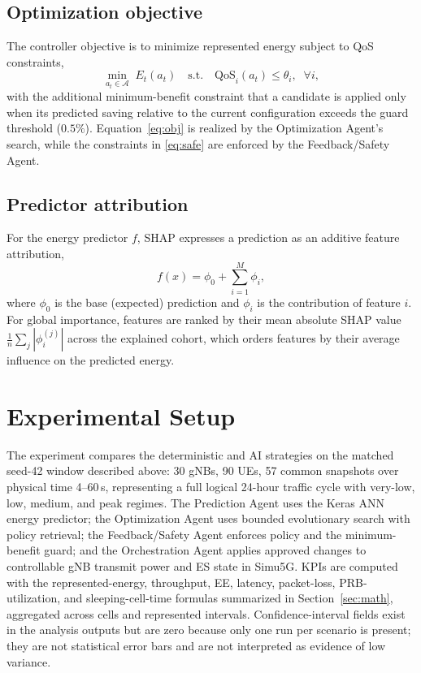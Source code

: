 \documentclass[conference]{IEEEtran}
\begin{document}
\subsection{Optimization objective}
The controller objective is to minimize represented energy subject to QoS constraints,
\begin{equation}
\min_{a_t \in \mathcal{A}} \; E_t(a_t)
\quad \text{s.t.} \quad \mathrm{QoS}_i(a_t) \le \theta_i, \;\; \forall i, \label{eq:obj}
\end{equation}
with the additional minimum-benefit constraint that a candidate is applied only when its predicted saving relative to the current configuration exceeds the guard threshold ($0.5\%$). Equation~\eqref{eq:obj} is realized by the Optimization Agent's search, while the constraints in \eqref{eq:safe} are enforced by the Feedback/Safety Agent.

\subsection{Predictor attribution}
For the energy predictor $f$, SHAP expresses a prediction as an additive feature attribution,
\begin{equation}
f(x) = \phi_0 + \sum_{i=1}^{M} \phi_i, \label{eq:shap}
\end{equation}
where $\phi_0$ is the base (expected) prediction and $\phi_i$ is the contribution of feature $i$. For global importance, features are ranked by their mean absolute SHAP value $\frac{1}{n}\sum_{j} |\phi_i^{(j)}|$ across the explained cohort, which orders features by their average influence on the predicted energy.

\section{Experimental Setup}
The experiment compares the deterministic and AI strategies on the matched seed-42 window described above: 30 gNBs, 90 UEs, 57 common snapshots over physical time 4--60\,s, representing a full logical 24-hour traffic cycle with very-low, low, medium, and peak regimes. The Prediction Agent uses the Keras ANN energy predictor; the Optimization Agent uses bounded evolutionary search with policy retrieval; the Feedback/Safety Agent enforces policy and the minimum-benefit guard; and the Orchestration Agent applies approved changes to controllable gNB transmit power and ES state in Simu5G. KPIs are computed with the represented-energy, throughput, EE, latency, packet-loss, PRB-utilization, and sleeping-cell-time formulas summarized in Section~\ref{sec:math}, aggregated across cells and represented intervals. Confidence-interval fields exist in the analysis outputs but are zero because only one run per scenario is present; they are not statistical error bars and are not interpreted as evidence of low variance.
\end{document}
